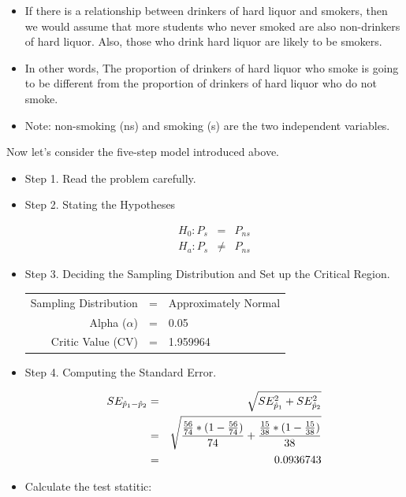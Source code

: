 \documentclass[11pt, chapterprefix=true]{scrbook}\usepackage[]{graphicx}\usepackage[]{color}
\begin{document}
\begin{itemize}
\item If there is a relationship between drinkers of hard liquor and smokers, then we would assume that more students who never smoked are also non-drinkers of hard liquor. Also, those who drink hard liquor are likely to be smokers.
\item In other words, The proportion of drinkers of hard liquor who smoke is going to be different from the proportion of drinkers of hard liquor who do not smoke.
\item Note: non-smoking (ns) and smoking (s) are the two independent variables.
\end{itemize}

Now let's consider the five-step model introduced above.

\begin{itemize}
\item Step 1. Read the problem carefully.
\item Step 2. Stating the Hypotheses 

\begin{eqnarray*}
H_0: P_s & = & P_{ns} \\
H_a: P_s & \ne & P_{ns} 
\end{eqnarray*}

\item Step 3.  Deciding the Sampling Distribution and Set up the Critical Region.



\begin{tabular}{@{} rcl @{}}
Sampling Distribution & = & Approximately Normal \\
Alpha ($\alpha$)  & = & 0.05 \\
Critic Value (CV) & = & 1.959964 
\end{tabular}

\item Step 4.  Computing the Standard Error.

\begin{eqnarray*}
    SE_{\hat{p}_1-\hat{p}_2} &=& \sqrt{SE_{\hat{p}_1}^2 + SE_{\hat{p}_2}^2} \\
             &=& \sqrt{ \frac{\frac{56}{74} *(1 - \frac{56}{74})}{74} + \frac{\frac{15}{38} *(1 - \frac{15}{38})}{38} } \\ \vspace{3mm}
             &=& 0.0936743
  \end{eqnarray*}
    
  \item Calculate the test statitic:
  

\end{itemize}
\end{document}
